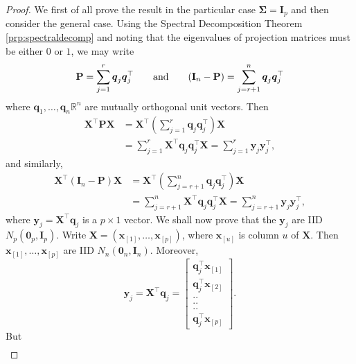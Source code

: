 \documentclass[]{book}
\theoremstyle{definition}
\theoremstyle{definition}
\theoremstyle{definition}
\theoremstyle{remark}
\begin{document}
\begin{proof}
{}We first of all prove the result in the particular case \(\boldsymbol \Sigma= {\mathbf I}_p\) and
then consider the general case. Using the Spectral Decomposition Theorem \ref{prp:spectraldecomp} and noting that the eigenvalues of projection matrices must be either \(0\) or \(1\), we may write
\[
{\mathbf P}=\sum_{j=1}^r \boldsymbol q_j \boldsymbol q_j^\top \qquad  \hbox{and} \qquad 
(\mathbf I_n-{\mathbf P})=\sum_{j=r+1}^n \boldsymbol q_j \boldsymbol q_j^\top
\]
where \(\boldsymbol q_1, \ldots , \boldsymbol q_n\mathbb{R}^n\) are mutually orthogonal unit vectors. Then
\begin{align}
\boldsymbol X^\top \boldsymbol P\boldsymbol X&=  \boldsymbol X^\top \left (\sum_{j=1}^r \boldsymbol q_j \boldsymbol q_j^\top \right) \boldsymbol X\nonumber \\
& =\sum_{j=1}^r \boldsymbol X^\top \boldsymbol q_j \boldsymbol q_j^\top \boldsymbol X=\sum_{j=1}^r \boldsymbol y_j \boldsymbol y_j^\top,
\label{eq:Prep}
\end{align}
and similarly,
\begin{align}
\boldsymbol X^\top (\mathbf I_n -\boldsymbol P) \boldsymbol X&=  \boldsymbol X^\top \left (\sum_{j=r+1}^n \boldsymbol q_j \boldsymbol q_j^\top \right) \boldsymbol X\nonumber \\
& =\sum_{j=r+1}^n \boldsymbol X^\top \boldsymbol q_j \boldsymbol q_j^\top \boldsymbol X=\sum_{j=r+1}^n \boldsymbol y_j \boldsymbol y_j^\top,
\label{eq:I-Prep}
\end{align}
where \(\boldsymbol y_j=\boldsymbol X^\top \boldsymbol q_j\) is a \(p \times 1\) vector. We shall now prove that the \(\boldsymbol y_j\) are
IID \(N_p({\mathbf 0}_p, \mathbf I_p)\). Write \(\boldsymbol X=(\boldsymbol x_{[1]}, \ldots , \boldsymbol x_{[p]})\), where \(\boldsymbol x_{[u]}\) is column \(u\) of
\(\boldsymbol X\). Then \(\boldsymbol x_{[1]}, \ldots , \boldsymbol x_{[p]}\) are IID \(N_n({\mathbf 0}_n ,\mathbf I_n)\). Moreover,
\[
\boldsymbol y_j=\boldsymbol X^\top \boldsymbol q_j = \left [  \begin{array}{c}
\boldsymbol q_j^\top \boldsymbol x_{[1]}\\
\boldsymbol q_j^\top \boldsymbol x_{[2]}\\
..\\
..\\
..\\
\boldsymbol q_j^\top \boldsymbol x_{[p]}
\end{array} \right ].
\]
But
\begin{align}

\end{align}
\end{proof}
\end{document}
